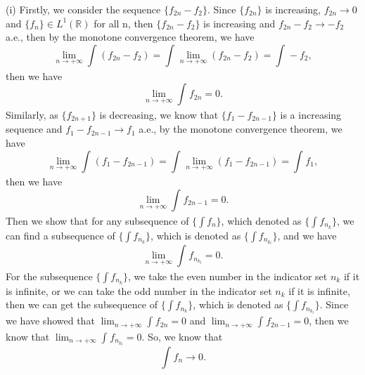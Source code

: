 \documentclass[12pt]{article}
\begin{document}
(i) Firstly, we consider the sequence $\{f_{2n} - f_{2}\}$. Since $\{f_{2n}\}$ is increasing, $f_{2n} \to 0$ and $\{f_{n}\} \in L^{1}(\mathbb{R})$ for all n, then $\{f_{2n} - f_{2}\}$ is increasing and $f_{2n} - f_{2} \to -f_{2}$ a.e., then by the monotone convergence theorem, we have
\begin{equation*}
    \lim_{n \to + \infty} \int_{}^{} (f_{2n} - f_{2}) =  \int_{}^{} \lim_{n \to + \infty} (f_{2n} - f_{2}) = \int_{}^{}  - f_{2},
\end{equation*}
then we have
\begin{equation*}
    \lim_{n \to + \infty} \int_{}^{} f_{2n} =  0.
\end{equation*}
Similarly, as $\{f_{2n + 1} \}$ is decreasing, we know that  $\{f_{1} - f_{2n -1} \}$ is a increasing sequence and $f_{1} - f_{2n-1} \to f_{1}$ a.e., by the monotone convergence theorem, we have
\begin{equation*}
    \lim_{n \to + \infty} \int_{}^{} (f_{1} - f_{2n-1}) =  \int_{}^{} \lim_{n \to + \infty} (f_{1} - f_{2n-1}) = \int_{}^{}  f_{1},
\end{equation*}
then we have
\begin{equation*}
    \lim_{n \to + \infty} \int_{}^{} f_{2n-1} =  0.
\end{equation*}
Then we show that for any subsequence of $\{\int f_{n}\}$, which denoted as $\{\int f_{n_{k}}\}$, we can find a subsequence of $\{\int f_{n_{k}}\}$, which is denoted as $\{\int f_{n_{k_{l}}}\}$, and we have
\begin{equation*}
    \lim_{n \to + \infty} \int_{}^{} f_{n_{k_{l}}} =  0.
\end{equation*}
For the subsequence $\{\int f_{n_{k}}\}$, we take the even number in the indicator set ${n_{k}}$ if it is infinite, or we can take the odd number in the indicator set ${n_{k}}$ if it is infinite, then we can get the subsequence of $\{\int f_{n_{k}}\}$, which is denoted as $\{\int f_{n_{k_{l}}}\}$. Since we have showed that $\lim_{n \to + \infty} \int_{}^{} f_{2n} =  0$ and $\lim_{n \to + \infty} \int_{}^{} f_{2n-1} =  0$, then we know that $\lim_{n \to + \infty} \int_{}^{} f_{n_{k_{l}}} =  0$. So, we know that
\begin{equation*}
    \int_{}^{} f_{n} \to 0.
\end{equation*}
\end{document}
